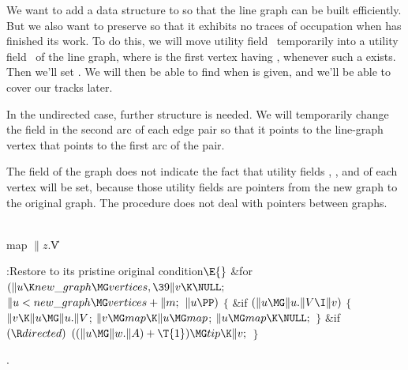 We want to add a data structure to  so that the line graph can be
built efficiently. But we also want to preserve  so that it
exhibits no traces of occupation when  has finished its
work.  To do this, we will move utility field~ temporarily into
a utility field~ of the line graph, where  is the first
vertex having , whenever such a  exists. Then
we'll
set . We will then be able to find  when 
is given, and we'll be able to cover our tracks later.

In the undirected case, further structure is needed. We will temporarily
change the  field in the second arc of each edge pair so that
it points to the line-graph vertex that points to the first arc of the pair.

The  field of the graph does not indicate the fact that
utility
fields , , and  of each vertex will
be set, because those
utility fields are pointers from the new graph to the original graph.
The  procedure does not deal with pointers between graphs.

\Y\B\4\D\\{map}\5
$\|z.{}$\|V\par
\Y\B\4:Restore  to its pristine original condition\X${}\E{}$\6
\&{for} ${}(\|u\K\\{new\_graph}\MG\\{vertices},\39\|v\K\NULL;{}$ ${}\|u<\\{new%
\_graph}\MG\\{vertices}+\|m;{}$ ${}\|u\PP){}$\5
${}\{{}$\1\6
\&{if} ${}(\|u\MG\|u.\|V\I\|v){}$\5
${}\{{}$\1\6
${}\|v\K\|u\MG\|u.\|V{}$;\6
${}\|v\MG\\{map}\K\|u\MG\\{map}{}$;\6
${}\|u\MG\\{map}\K\NULL;{}$\6
\4${}\}{}$\2\6
\&{if} ${}(\R\\{directed}){}$\1\5
${}((\|u\MG\|w.\|A)+\T{1})\MG\\{tip}\K\|v;{}$\2\6
\4${}\}{}$\2\par
{}.\fi

